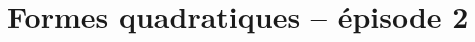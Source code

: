 \documentclass[./main]{subfiles}
\begin{document}
  \chapter{Formes quadratiques -- épisode 2}
  \minitoc
\end{document}
